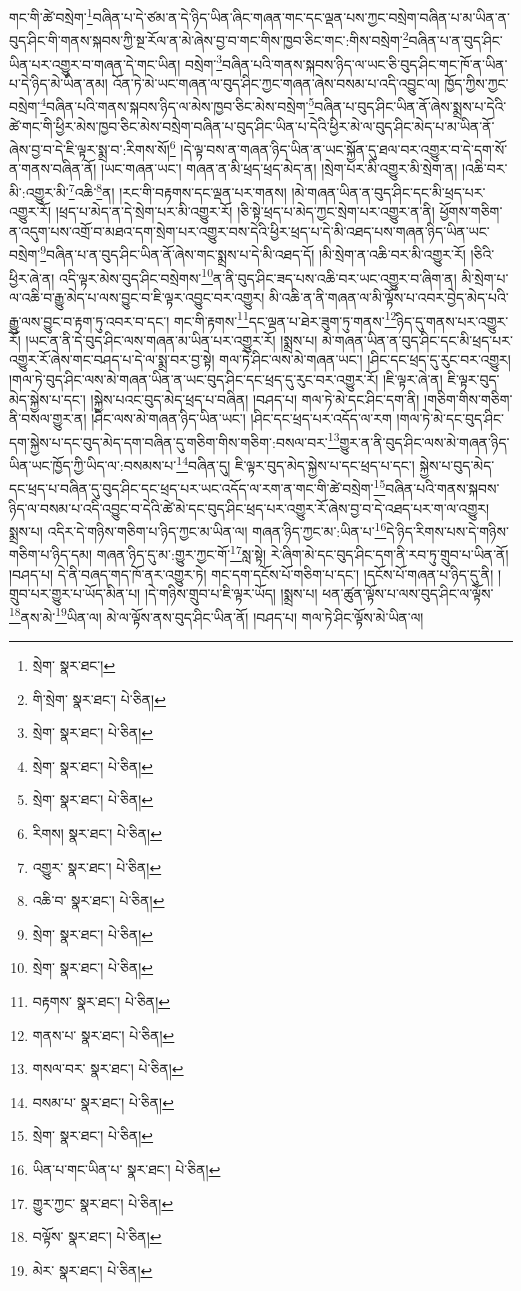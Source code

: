 གང་གི་ཚེ་བསྲེག་\footnote{སྲེག་  སྣར་ཐང་། }བཞིན་པ་དེ་ཙམ་ན་དེ་ཉིད་ཡིན་ཞིང་གཞན་གང་དང་ལྡན་པས་ཀྱང་བསྲེག་བཞིན་པ་མ་ཡིན་ན་བུད་ཤིང་གི་གནས་སྐབས་ཀྱི་སྔ་རོལ་ན་མེ་ཞེས་བྱ་བ་གང་གིས་ཁྱབ་ཅིང་གང་:གིས་བསྲེག་\footnote{གི་སྲེག་  སྣར་ཐང་།  པེ་ཅིན། }བཞིན་པ་ན་བུད་ཤིང་ཡིན་པར་འགྱུར་བ་གཞན་དེ་གང་ཡིན། བསྲེག་\footnote{སྲེག་  སྣར་ཐང་།  པེ་ཅིན། }བཞིན་པའི་གནས་སྐབས་ཉིད་ལ་ཡང་ཅི་བུད་ཤིང་གང་ཁོ་ན་ཡིན་པ་དེ་ཉིད་མེ་ཡིན་ནམ། འོན་ཏེ་མེ་ཡང་གཞན་ལ་བུད་ཤིང་ཀྱང་གཞན་ཞེས་བསམ་པ་འདི་འབྱུང་ལ། ཁྱོད་ཀྱིས་ཀྱང་བསྲེག་\footnote{སྲེག་  སྣར་ཐང་།  པེ་ཅིན། }བཞིན་པའི་གནས་སྐབས་ཉིད་ལ་མེས་ཁྱབ་ཅིང་མེས་བསྲེག་\footnote{སྲེག་  སྣར་ཐང་།  པེ་ཅིན། }བཞིན་པ་བུད་ཤིང་ཡིན་ནོ་ཞེས་སྨྲས་པ་དེའི་ཚེ་གང་གི་ཕྱིར་མེས་ཁྱབ་ཅིང་མེས་བསྲེག་བཞིན་པ་བུད་ཤིང་ཡིན་པ་དེའི་ཕྱིར་མེ་ལ་བུད་ཤིང་མེད་པ་མ་ཡིན་ནོ་ཞེས་བྱ་བ་དེ་ཇི་ལྟར་སྨྲ་བ་:རིགས་སོ།\footnote{རིགས།  སྣར་ཐང་།  པེ་ཅིན། } །དེ་ལྟ་བས་ན་གཞན་ཉིད་ཡིན་ན་ཡང་སྐྱོན་དུ་ཐལ་བར་འགྱུར་བ་དེ་དག་སོ་ན་གནས་བཞིན་ནོ། །ཡང་གཞན་ཡང་། གཞན་ན་མི་ཕྲད་ཕྲད་མེད་ན། །སྲེག་པར་མི་འགྱུར་མི་སྲེག་ན། །འཆི་བར་མི་:འགྱུར་མི་\footnote{འགྱུར་  སྣར་ཐང་།  པེ་ཅིན། }འཆི་\footnote{འཆི་བ་  སྣར་ཐང་།  པེ་ཅིན། }ན། །རང་གི་བརྟགས་དང་ལྡན་པར་གནས། །མེ་གཞན་ཡིན་ན་བུད་ཤིང་དང་མི་ཕྲད་པར་འགྱུར་རོ། །ཕྲད་པ་མེད་ན་དེ་སྲེག་པར་མི་འགྱུར་རོ། །ཅི་སྟེ་ཕྲད་པ་མེད་ཀྱང་སྲེག་པར་འགྱུར་ན་ནི། ཕྱོགས་གཅིག་ན་འདུག་པས་འགྲོ་བ་མཐའ་དག་སྲེག་པར་འགྱུར་བས་དེའི་ཕྱིར་ཕྲད་པ་དེ་མི་འཐད་པས་གཞན་ཉིད་ཡིན་ཡང་བསྲེག་\footnote{སྲེག་  སྣར་ཐང་།  པེ་ཅིན། }བཞིན་པ་ན་བུད་ཤིང་ཡིན་ནོ་ཞེས་གང་སྨྲས་པ་དེ་མི་འཐད་དོ། །མི་སྲེག་ན་འཆི་བར་མི་འགྱུར་རོ། །ཅིའི་ཕྱིར་ཞེ་ན། འདི་ལྟར་མེས་བུད་ཤིང་བསྲེགས་\footnote{སྲེག་  སྣར་ཐང་།  པེ་ཅིན། }ན་ནི་བུད་ཤིང་ཟད་པས་འཆི་བར་ཡང་འགྱུར་བ་ཞིག་ན། མི་སྲེག་པ་ལ་འཆི་བ་རྒྱུ་མེད་པ་ལས་བྱུང་བ་ཇི་ལྟར་འབྱུང་བར་འགྱུར། མི་འཆི་ན་ནི་གཞན་ལ་མི་ལྟོས་པ་འབར་བྱེད་མེད་པའི་རྒྱུ་ལས་བྱུང་བ་རྟག་ཏུ་འབར་བ་དང་། གང་གི་རྟགས་\footnote{བརྟགས་  སྣར་ཐང་།  པེ་ཅིན། }དང་ལྡན་པ་ཐེར་ཟུག་ཏུ་གནས་\footnote{གནས་པ་  སྣར་ཐང་།  པེ་ཅིན། }ཉིད་དུ་གནས་པར་འགྱུར་རོ། །ཡང་ན་ནི་དེ་བུད་ཤིང་ལས་གཞན་མ་ཡིན་པར་འགྱུར་རོ། །སྨྲས་པ། མེ་གཞན་ཡིན་ན་བུད་ཤིང་དང་མི་ཕྲད་པར་འགྱུར་རོ་ཞེས་གང་བཤད་པ་དེ་ལ་སྨྲ་བར་བྱ་སྟེ། གལ་ཏེ་ཤིང་ལས་མེ་གཞན་ཡང་། །ཤིང་དང་ཕྲད་དུ་རུང་བར་འགྱུར། །གལ་ཏེ་བུད་ཤིང་ལས་མེ་གཞན་ཡིན་ན་ཡང་བུད་ཤིང་དང་ཕྲད་དུ་རུང་བར་འགྱུར་རོ། །ཇི་ལྟར་ཞེ་ན། ཇི་ལྟར་བུད་མེད་སྐྱེས་པ་དང་། །སྐྱེས་པའང་བུད་མེད་ཕྲད་པ་བཞིན། །བཤད་པ། གལ་ཏེ་མེ་དང་ཤིང་དག་ནི། །གཅིག་གིས་གཅིག་ནི་བསལ་གྱུར་ན། །ཤིང་ལས་མེ་གཞན་ཉིད་ཡིན་ཡང་། །ཤིང་དང་ཕྲད་པར་འདོད་ལ་རག །གལ་ཏེ་མེ་དང་བུད་ཤིང་དག་སྐྱེས་པ་དང་བུད་མེད་དག་བཞིན་དུ་གཅིག་གིས་གཅིག་:བསལ་བར་\footnote{གསལ་བར་  སྣར་ཐང་།  པེ་ཅིན། }གྱུར་ན་ནི་བུད་ཤིང་ལས་མེ་གཞན་ཉིད་ཡིན་ཡང་ཁྱོད་ཀྱི་ཡིད་ལ་:བསམས་པ་\footnote{བསམ་པ་  སྣར་ཐང་།  པེ་ཅིན། }བཞིན་དུ། ཇི་ལྟར་བུད་མེད་སྐྱེས་པ་དང་ཕྲད་པ་དང་། སྐྱེས་པ་བུད་མེད་དང་ཕྲད་པ་བཞིན་དུ་བུད་ཤིང་དང་ཕྲད་པར་ཡང་འདོད་ལ་རག་ན་གང་གི་ཚེ་བསྲེག་\footnote{སྲེག་  སྣར་ཐང་།  པེ་ཅིན། }བཞིན་པའི་གནས་སྐབས་ཉིད་ལ་བསམ་པ་འདི་འབྱུང་བ་དེའི་ཚེ་མེ་དང་བུད་ཤིང་ཕྲད་པར་འགྱུར་རོ་ཞེས་བྱ་བ་དེ་འཐད་པར་ག་ལ་འགྱུར། སྨྲས་པ། འདིར་དེ་གཉིས་གཅིག་པ་ཉིད་ཀྱང་མ་ཡིན་ལ། གཞན་ཉིད་ཀྱང་མ་:ཡིན་པ་\footnote{ཡིན་པ་གང་ཡིན་པ་  སྣར་ཐང་།  པེ་ཅིན། }དེ་ཉིད་རིགས་པས་དེ་གཉིས་གཅིག་པ་ཉིད་དམ། གཞན་ཉིད་དུ་མ་:གྱུར་ཀྱང་གོ་\footnote{གྱུར་ཀྱང་  སྣར་ཐང་།  པེ་ཅིན། }སླ་སྟེ། རེ་ཞིག་མེ་དང་བུད་ཤིང་དག་ནི་རབ་ཏུ་གྲུབ་པ་ཡིན་ནོ། །བཤད་པ། དེ་ནི་བཞད་གད་ཁོ་ནར་འགྱུར་ཏེ། གང་དག་དངོས་པོ་གཅིག་པ་དང་། །དངོས་པོ་གཞན་པ་ཉིད་དུ་ནི། །གྲུབ་པར་གྱུར་པ་ཡོད་མིན་པ། །དེ་གཉིས་གྲུབ་པ་ཇི་ལྟར་ཡོད། །སྨྲས་པ། ཕན་ཚུན་ལྟོས་པ་ལས་བུད་ཤིང་ལ་ལྟོས་\footnote{བལྟོས་  སྣར་ཐང་།  པེ་ཅིན། }ནས་མེ་\footnote{མེར་  སྣར་ཐང་།  པེ་ཅིན། }ཡིན་ལ། མེ་ལ་ལྟོས་ནས་བུད་ཤིང་ཡིན་ནོ། །བཤད་པ། གལ་ཏེ་ཤིང་ལྟོས་མེ་ཡིན་ལ། 